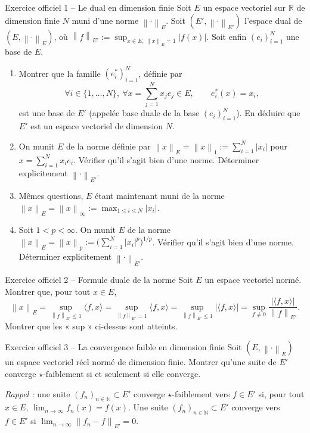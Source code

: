 \documentclass[11pt,a4paper]{article}
\newcommand{\R}{\mathbb{R}}
\newcommand{\N}{\mathbb{N}}
\newcommand{\norm}[1]{\left\|#1\right\|}
\theoremstyle{definition}
\begin{document}
\begin{exo}{Exercice officiel 1 -- Le dual en dimension finie}
Soit $E$ un espace vectoriel sur $\R$ de dimension finie $N$ muni d'une norme $\norm\cdot_E$. Soit $(E',\norm\cdot_{E'})$ l'espace dual de $(E,\norm\cdot_E)$, où $\norm f_{E'}:=\sup_{x\in E,\,\norm x_E=1}|f(x)|$. Soit enfin $(e_i)_{i=1}^N$ une base de $E$.
\begin{enumerate}[label=(\alph*)]
  \item Montrer que la famille $(e_i^*)_{i=1}^N$, définie par
  \[
  \forall i\in\{1,\dots,N\},\ \forall x=\sum_{j=1}^Nx_je_j\in E,\qquad e_i^*(x)=x_i,
  \]
  est une base de $E'$ (appelée base duale de la base $(e_i)_{i=1}^N$). En déduire que $E'$ est un espace vectoriel de dimension $N$.
  \item On munit $E$ de la norme définie par $\norm x_E=\norm x_1:=\sum_{i=1}^N|x_i|$ pour $x=\sum_{i=1}^Nx_ie_i$. Vérifier qu'il s'agit bien d'une norme. Déterminer explicitement $\norm\cdot_{E'}$.
  \item Mêmes questions, $E$ étant maintenant muni de la norme $\norm x_E=\norm x_\infty:=\max_{1\le i\le N}|x_i|$.
  \item Soit $1<p<\infty$. On munit $E$ de la norme $\norm x_E=\norm x_p:=\big(\sum_{i=1}^N|x_i|^p\big)^{1/p}$. Vérifier qu'il s'agit bien d'une norme. Déterminer explicitement $\norm\cdot_{E'}$.
\end{enumerate}
\end{exo}

\begin{exo}{Exercice officiel 2 -- Formule duale de la norme}
Soit $E$ un espace vectoriel normé. Montrer que, pour tout $x\in E$,
\[
\norm x_E=\sup_{\norm f_{E'}\le1}\langle f,x\rangle=\sup_{\norm f_{E'}=1}\langle f,x\rangle=\sup_{\norm f_{E'}\le1}|\langle f,x\rangle|=\sup_{f\ne0}\frac{|\langle f,x\rangle|}{\norm f_{E'}} .
\]
Montrer que les « sup » ci-dessus sont atteints.
\end{exo}

\begin{exo}{Exercice officiel 3 -- La convergence faible en dimension finie}
Soit $(E,\norm\cdot_E)$ un espace vectoriel réel normé de dimension finie. Montrer qu'une suite de $E'$ converge $\star$-faiblement si et seulement si elle converge.

\emph{Rappel :} une suite $(f_n)_{n\in\N}\subset E'$ converge $\star$-faiblement vers $f\in E'$ si, pour tout $x\in E$, $\lim_{n\to\infty}f_n(x)=f(x)$. Une suite $(f_n)_{n\in\N}\subset E'$ converge vers $f\in E'$ si $\lim_{n\to\infty}\norm{f_n-f}_{E'}=0$.
\end{exo}
\end{document}
